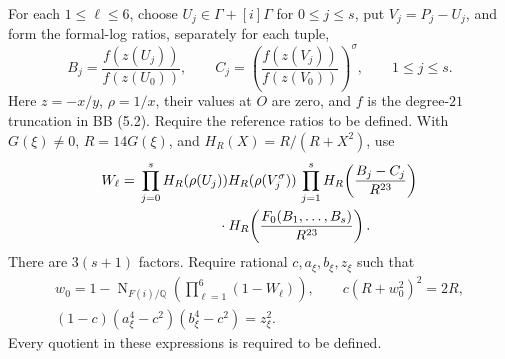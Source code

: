\documentclass[11pt,a4paper]{article}
\newcommand{\Q}{\mathbb Q}\newcommand{\Z}{\mathbb Z}
\begin{document}
For each $1\le\ell\le6$, choose $U_j\in\Gamma+[i]\Gamma$
for $0\le j\le s$, put $V_j=P_j-U_j$, and form the formal-log
ratios, separately for each tuple,
\[
 B_j=\frac{f(z(U_j))}{f(z(U_0))},\qquad
 C_j=\left(\frac{f(z(V_j))}{f(z(V_0))}\right)^\sigma,
 \qquad 1\le j\le s.
\]
Here $z=-x/y$, $\rho=1/x$, their values at $O$ are zero, and
$f$ is the degree-$21$ truncation in BB (5.2). Require the reference
ratios to be defined. With $G(\xi)\ne0$, $R=14G(\xi)$, and
$H_R(X)=R/(R+X^2)$, use
\begin{align*}
 W_\ell={}&
 \prod_{j=0}^{s}H_R(\rho(U_j))H_R(\rho(V_j^\sigma))\,
 \prod_{j=1}^{s}H_R\!\left(\frac{B_j-C_j}{R^{23}}\right)\\
 &\hspace{20mm}\cdot
 H_R\!\left(\frac{F_0(B_1,\ldots,B_s)}{R^{23}}\right).
\end{align*}
There are $3(s+1)$ factors. Require rational $c,a_\xi,b_\xi,z_\xi$
such that
\begin{gather*}
 w_0=1-\operatorname{N}_{F(i)/\Q}
      \left(\prod_{\ell=1}^{6}(1-W_\ell)\right),\qquad
 c(R+w_0^2)^2=2R,\\
 (1-c)(a_\xi^4-c^2)(b_\xi^4-c^2)=z_\xi^2.
\end{gather*}
Every quotient in these expressions is required to be defined.
\end{document}
